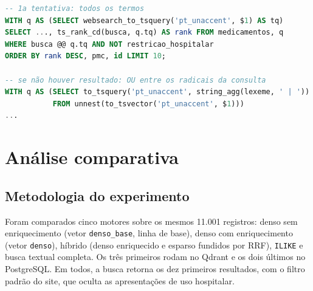\documentclass[12pt,oneside,a4paper,english,brazil]{abntex2}
\newcommand{\campo}[1]{\texttt{#1}}
\begin{document}
\begin{lstlisting}[language=SQL, caption={Busca textual completa com relaxamento de E para OU}, label=cod:fts]
-- 1a tentativa: todos os termos
WITH q AS (SELECT websearch_to_tsquery('pt_unaccent', $1) AS tq)
SELECT ..., ts_rank_cd(busca, q.tq) AS rank FROM medicamentos, q
WHERE busca @@ q.tq AND NOT restricao_hospitalar
ORDER BY rank DESC, pmc, id LIMIT 10;

-- se não houver resultado: OU entre os radicais da consulta
WITH q AS (SELECT to_tsquery('pt_unaccent', string_agg(lexeme, ' | '))
           FROM unnest(to_tsvector('pt_unaccent', $1)))
...
\end{lstlisting}

\chapter{Análise comparativa}

\section{Metodologia do experimento}
\label{sec:metodologia}

Foram comparados cinco motores sobre os mesmos 11.001 registros: denso sem enriquecimento (vetor \campo{denso\_base}, linha de base), denso com enriquecimento (vetor \campo{denso}), híbrido (denso enriquecido e esparso fundidos por RRF), \campo{ILIKE} e busca textual completa. Os três primeiros rodam no Qdrant e os dois últimos no PostgreSQL. Em todos, a busca retorna os dez primeiros resultados, com o filtro padrão do site, que oculta as apresentações de uso hospitalar.
\end{document}
